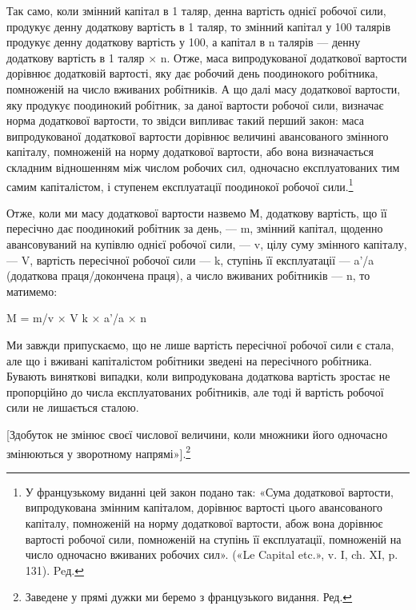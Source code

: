 Так само, коли змінний капітал в 1 таляр, денна вартість однієї
робочої сили, продукує денну додаткову вартість в 1 таляр, то
змінний капітал у 100 талярів продукує денну додаткову вартість
у 100, а капітал в n талярів — денну додаткову вартість в 1 таляр × n.
Отже, маса випродукованої додаткової вартости дорівнює додатковій
вартості, яку дає робочий день поодинокого робітника,
помноженій на число вживаних робітників. А що далі масу додаткової
вартости, яку продукує поодинокий робітник, за даної вартости
робочої сили, визначає норма додаткової вартости, то звідси
випливає такий перший закон: маса випродукованої додаткової
вартости дорівнює величині авансованого змінного капіталу, помноженій
на норму додаткової вартости, або вона визначається
складним відношенням між числом робочих сил, одночасно експлуатованих
тим самим капіталістом, і ступенем експлуатації
поодинокої робочої сили.\footnote*{
У французькому виданні цей закон подано так: «Сума додаткової
вартости, випродукована змінним капіталом, дорівнює вартості цього
авансованого капіталу, помноженій на норму додаткової вартости, абож
вона дорівнює вартості робочої сили, помноженій на ступінь її експлуатації,
помноженій на число одночасно вживаних робочих сил». («Le Capital
etc.», v. I, ch. XI, p. 131). Peд.
}

Отже, коли ми масу додаткової вартости назвемо М, додаткову
вартість, що її пересічно дає поодинокий робітник за день, — m,
змінний капітал, щоденно авансовуваний на купівлю однієї робочої
сили, — v, цілу суму змінного капіталу, — V, вартість пересічної
робочої сили — k, ступінь її експлуатації — a'/a (додаткова праця/докончена праця),
а число вживаних робітників — n, то матимемо:

M = m/v × V k × a'/a × n

Ми завжди припускаємо, що не лише вартість пересічної робочої
сили є стала, але що і вживані капіталістом робітники зведені
на пересічного робітника. Бувають виняткові випадки, коли
випродукована додаткова вартість зростає не пропорційно до числа
експлуатованих робітників, але тоді й вартість робочої сили не
лишається сталою.

[Здобуток не змінює своєї числової величини, коли множники
його одночасно змінюються у зворотному напрямі»].\footnote*{
Заведене у прямі дужки ми беремо з французького видання. Ред.
}

